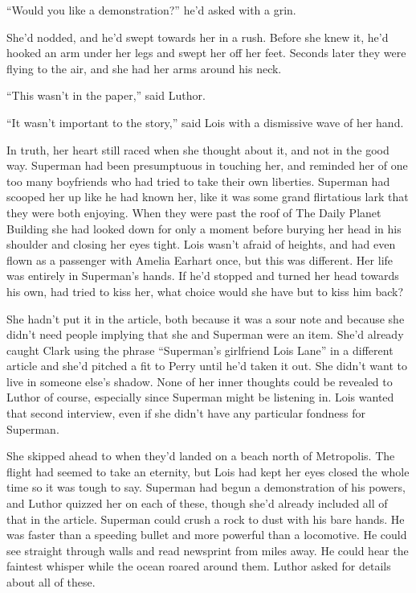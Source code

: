 \documentclass[ebook,12pt]{memoir}
\begin{document}
``Would you like a demonstration?'' he'd asked with a grin.

She'd nodded, and he'd swept towards her in a rush. Before she knew it,
he'd hooked an arm under her legs and swept her off her feet. Seconds
later they were flying to the air, and she had her arms around his neck.

``This wasn't in the paper,'' said Luthor.

``It wasn't important to the story,'' said Lois with a dismissive wave
of her hand.

In truth, her heart still raced when she thought about it, and not in
the good way. Superman had been presumptuous in touching her, and
reminded her of one too many boyfriends who had tried to take their own
liberties. Superman had scooped her up like he had known her, like it
was some grand flirtatious lark that they were both enjoying. When they
were past the roof of The Daily Planet Building she had looked down for
only a moment before burying her head in his shoulder and closing her
eyes tight. Lois wasn't afraid of heights, and had even flown as a
passenger with Amelia Earhart once, but this was different. Her life was
entirely in Superman's hands. If he'd stopped and turned her head
towards his own, had tried to kiss her, what choice would she have but
to kiss him back?

She hadn't put it in the article, both because it was a sour note and
because she didn't need people implying that she and Superman were an
item. She'd already caught Clark using the phrase ``Superman's
girlfriend Lois Lane'' in a different article and she'd pitched a fit to
Perry until he'd taken it out. She didn't want to live in someone else's
shadow. None of her inner thoughts could be revealed to Luthor of
course, especially since Superman might be listening in. Lois wanted
that second interview, even if she didn't have any particular fondness
for Superman.

She skipped ahead to when they'd landed on a beach north of Metropolis.
The flight had seemed to take an eternity, but Lois had kept her eyes
closed the whole time so it was tough to say. Superman had begun a
demonstration of his powers, and Luthor quizzed her on each of these,
though she'd already included all of that in the article. Superman could
crush a rock to dust with his bare hands. He was faster than a speeding
bullet and more powerful than a locomotive. He could see straight
through walls and read newsprint from miles away. He could hear the
faintest whisper while the ocean roared around them. Luthor asked for
details about all of these.
\end{document}
